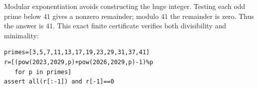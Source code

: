 Modular exponentiation avoids constructing the huge integer. Testing each odd prime below $41$ gives a nonzero remainder; modulo $41$ the remainder is zero. Thus the answer is $\boxed{41}$. This exact finite certificate verifies both divisibility and minimality:
\begin{verbatim}
primes=[3,5,7,11,13,17,19,23,29,31,37,41]
r=[(pow(2023,2029,p)+pow(2026,2029,p)-1)%p
   for p in primes]
assert all(r[:-1]) and r[-1]==0
\end{verbatim}
